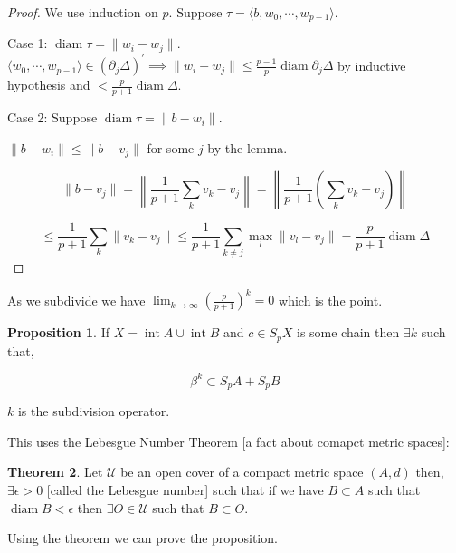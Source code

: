 \documentclass{article}
\theoremstyle{definition}
\newtheorem{theorem}{Theorem}
\newtheorem{proposition}[theorem]{Proposition}
\begin{document}
    \begin{proof}
        We use induction on \(p\). Suppose \(\tau  = \langle b, w_0, \cdots , w_{p-1} \rangle\). 

        Case 1: \(\operatorname{diam} \tau  = \lVert w_i - w_j \rVert\). \(\langle w_0, \cdots , w_{p-1} \rangle \in (\partial_j \Delta)^{\prime} \implies \lVert w_i - w_j \rVert \leq \frac{p-1}{p} \operatorname{diam} \partial_j \Delta\) by inductive hypothesis and \(< \frac{p}{p+1} \operatorname{diam} \Delta\).
        
        Case 2: Suppose \(\operatorname{diam} \tau = \lVert b - w_i \rVert\).

        \(\lVert b - w_i \rVert \leq \lVert b - v_j \rVert \) for some \(j\) by the lemma.

        \[
            \lVert b - v_j \rVert = \left\lVert \frac{1}{p+1} \sum_{k} v_k - v_j \right\rVert = \left\lVert \frac{1}{p+1} \left( \sum_{k} v_k - v_j \right)  \right\rVert 
        \]

        \[
            \leq \frac{1}{p+1} \sum_{k} \lVert v_k - v_j \rVert \leq \frac{1}{p+1} \sum_{k\neq j} \max_l \lVert v_l - v_j \rVert = \frac{p}{p+1} \operatorname{diam} \Delta 
        \] 
    \end{proof}

    As we subdivide we have \(\lim_{k \to \infty} \left( \frac{p}{p+1} \right)^k = 0\) which is the point.

    \begin{proposition}
        If \(X = \operatorname{int} A \cup \operatorname{int} B\) and \(c \in S_p X\) is some chain then \(\exists k\) such that,

        \[
            \beta^k \subset S_p A + S_p B
        \]

        \(k\) is the subdivision operator.
    \end{proposition}

    This uses the Lebesgue Number Theorem [a fact about comapct metric spaces]:

    \begin{theorem}
        Let \(\mathcal{U}\) be an open cover of a compact metric space \((A,d)\) then, \(\exists \epsilon >0\) [called the Lebesgue number] such that if we have \(B \subset A\) such that \(\operatorname{diam} B < \epsilon\) then \(\exists O \in \mathcal{U}\) such that \(B \subset O\).
    \end{theorem}

    Using the theorem we can prove the proposition.
\end{document}
